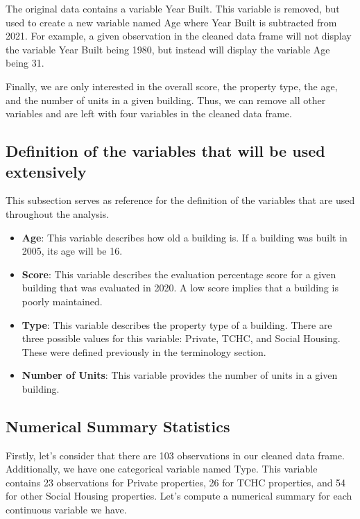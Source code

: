 \documentclass[
]{article}
\begin{document}
The original data contains a variable Year Built. This variable is
removed, but used to create a new variable named Age where Year Built is
subtracted from 2021. For example, a given observation in the cleaned
data frame will not display the variable Year Built being 1980, but
instead will display the variable Age being 31.

Finally, we are only interested in the overall score, the property type,
the age, and the number of units in a given building. Thus, we can
remove all other variables and are left with four variables in the
cleaned data frame.

\hypertarget{definition-of-the-variables-that-will-be-used-extensively}{%
\subsection{Definition of the variables that will be used
extensively}\label{definition-of-the-variables-that-will-be-used-extensively}}

This subsection serves as reference for the definition of the variables
that are used throughout the analysis.

\begin{itemize}
\item
  \textbf{Age}: This variable describes how old a building is. If a
  building was built in 2005, its age will be 16.
\item
  \textbf{Score}: This variable describes the evaluation percentage
  score for a given building that was evaluated in 2020. A low score
  implies that a building is poorly maintained.
\item
  \textbf{Type}: This variable describes the property type of a
  building. There are three possible values for this variable: Private,
  TCHC, and Social Housing. These were defined previously in the
  terminology section.
\item
  \textbf{Number of Units}: This variable provides the number of units
  in a given building.
\end{itemize}

\hypertarget{numerical-summary-statistics}{%
\subsection{Numerical Summary
Statistics}\label{numerical-summary-statistics}}

Firstly, let's consider that there are 103 observations in our cleaned
data frame. Additionally, we have one categorical variable named Type.
This variable contains 23 observations for Private properties, 26 for
TCHC properties, and 54 for other Social Housing properties. Let's
compute a numerical summary for each continuous variable we have.
\end{document}
